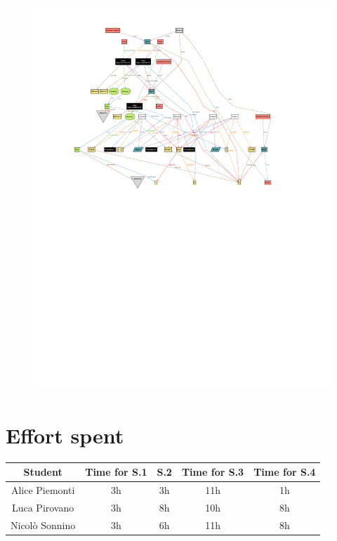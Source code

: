 \documentclass[table, 12pt]{article}
\begin{document}
\begin{landscape}
\begin{figure}[H]
        \includegraphics[scale=1.5]{assets/Alloy-Analyzer/world3.pdf}
    \end{figure}
\end{landscape}
\pagestyle{plain}
\section{Effort spent}
\begin{tabular}{ | c || c | c | c | c|}
    \hline
    Student        & Time for S.1 & S.2 & Time for S.3 & Time for S.4 \\ \hline
    Alice Piemonti & 3h           & 3h  & 11h          & 1h           \\ \hline
    Luca Pirovano  & 3h           & 8h  & 10h          & 8h           \\ \hline
    Nicolò Sonnino & 3h           & 6h  & 11h          & 8h           \\
    \hline
\end{tabular}
\end{document}

